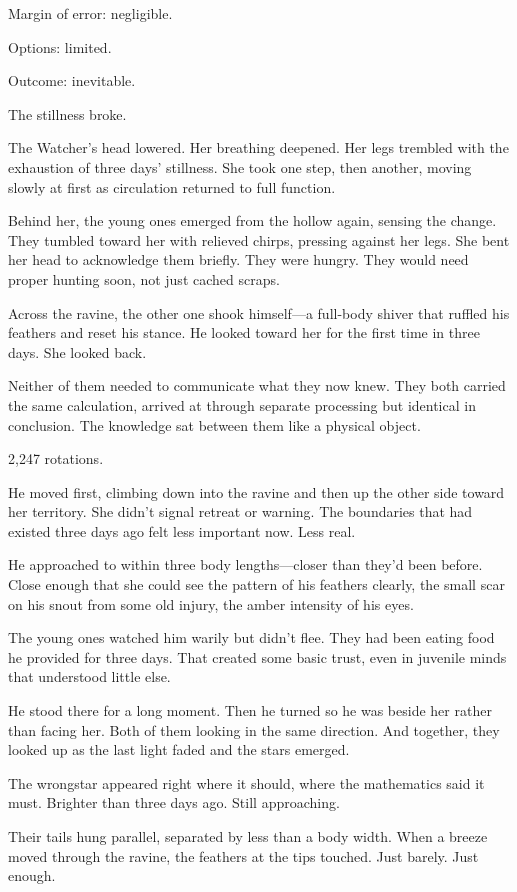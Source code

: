 Margin of error: negligible.

Options: limited.

Outcome: inevitable.

The stillness broke.

The Watcher's head lowered. Her breathing deepened. Her legs trembled with the exhaustion of three days' stillness. She took one step, then another, moving slowly at first as circulation returned to full function.

Behind her, the young ones emerged from the hollow again, sensing the change. They tumbled toward her with relieved chirps, pressing against her legs. She bent her head to acknowledge them briefly. They were hungry. They would need proper hunting soon, not just cached scraps.

Across the ravine, the other one shook himself—a full-body shiver that ruffled his feathers and reset his stance. He looked toward her for the first time in three days. She looked back.

Neither of them needed to communicate what they now knew. They both carried the same calculation, arrived at through separate processing but identical in conclusion. The knowledge sat between them like a physical object.

2,247 rotations.

He moved first, climbing down into the ravine and then up the other side toward her territory. She didn't signal retreat or warning. The boundaries that had existed three days ago felt less important now. Less real.

He approached to within three body lengths—closer than they'd been before. Close enough that she could see the pattern of his feathers clearly, the small scar on his snout from some old injury, the amber intensity of his eyes.

The young ones watched him warily but didn't flee. They had been eating food he provided for three days. That created some basic trust, even in juvenile minds that understood little else.

He stood there for a long moment. Then he turned so he was beside her rather than facing her. Both of them looking in the same direction. And together, they looked up as the last light faded and the stars emerged.

The wrongstar appeared right where it should, where the mathematics said it must. Brighter than three days ago. Still approaching.

Their tails hung parallel, separated by less than a body width. When a breeze moved through the ravine, the feathers at the tips touched. Just barely. Just enough.

